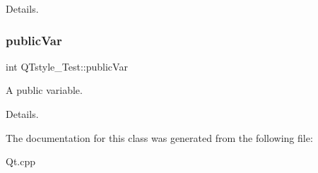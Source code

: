 Details. \mbox{\label{class_q_tstyle___test_aabf7b2e9ed83ea44aca4d213baae06d3}} 
\subsubsection{\texorpdfstring{public\+Var}{publicVar}}
{\footnotesize\ttfamily int Q\+Tstyle\+\_\+\+Test\+::public\+Var}



A public variable. 

Details. 

The documentation for this class was generated from the following file\+:\begin{DoxyCompactItemize}
\item 
Qt.\+cpp\end{DoxyCompactItemize}
